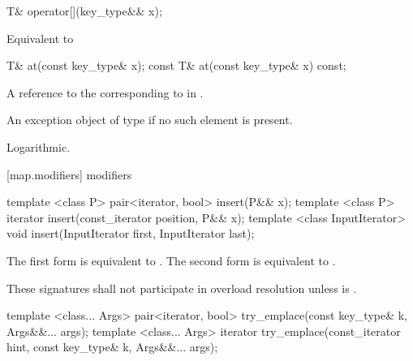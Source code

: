 %
\begin{itemdecl}
T& operator[](key_type&& x);
\end{itemdecl}

\begin{itemdescr}
\pnum
\effects
Equivalent to 
\end{itemdescr}

%
\begin{itemdecl}
T&       at(const key_type& x);
const T& at(const key_type& x) const;
\end{itemdecl}

\begin{itemdescr}
\pnum
\returns
A reference to the  corresponding to  in .

\pnum
\throws
An exception object of type  if
no such element is present.

\pnum
\complexity Logarithmic.
\end{itemdescr}

[map.modifiers]{ modifiers}

%
%
\begin{itemdecl}
template <class P> pair<iterator, bool> insert(P&& x);
template <class P> iterator insert(const_iterator position, P&& x);
template <class InputIterator>
  void insert(InputIterator first, InputIterator last);
\end{itemdecl}

\begin{itemdescr}
\pnum
\effects
The first form is equivalent to 
. The second form is
equivalent to .

\pnum
\remarks
These signatures shall not participate in overload resolution
unless  is
.
\end{itemdescr}

%
%
\begin{itemdecl}
template <class... Args> pair<iterator, bool> try_emplace(const key_type& k, Args&&... args);
template <class... Args> iterator try_emplace(const_iterator hint, const key_type& k, Args&&... args);
\end{itemdecl}

